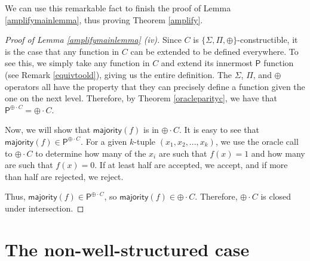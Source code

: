 \documentclass[11pt]{article}
\newcommand{\parity}{\oplus}
\newcommand{\p}{\textsf{P}}
\newcommand{\x}{\textsf{X}}
\newcommand{\majority}{\textsf{majority}}
\begin{document}
We can use this remarkable fact to finish the proof of Lemma \ref{amplifymainlemma}, thus proving Theorem \ref{amplify}.
\begin{proof}[Proof of Lemma \ref{amplifymainlemma} (iv)]
Since $C$ is $\{\Sigma,\Pi,\parity\}$-constructible, it is the case that any function in $C$ can be extended to be defined everywhere. To see this, we simply take any function in $C$ and extend its innermost $\p$ function (see Remark \ref{equivtoold}), giving us the entire definition. The $\Sigma$, $\Pi$, and $\parity$ operators all have the property that they can precisely define a function given the one on the next level. Therefore, by Theorem \ref{oracleparityc}, we have that $\p^{\parity\cdot C} = \parity\cdot C$.

Now, we will show that $\majority(f)$ is in $\parity \cdot C$. It is easy to see that $\majority(f) \in \p^{\parity \cdot C}$. For a given $k$-tuple $(x_1,x_2,...,x_k)$, we use the oracle call to $\parity \cdot C$ to determine how many of the $x_i$ are such that $f(x) = 1$ and how many are such that $f(x) = 0$. If at least half are accepted, we accept, and if more than half are rejected, we reject.

Thus, $\majority(f) \in  \p^{\parity \cdot C}$, so $\majority(f) \in \parity \cdot C$. Therefore, $\parity \cdot C$ is closed under intersection.
%
%
\end{proof}

\section{The non-well-structured case}\label{notwellstruct}
\end{document}
